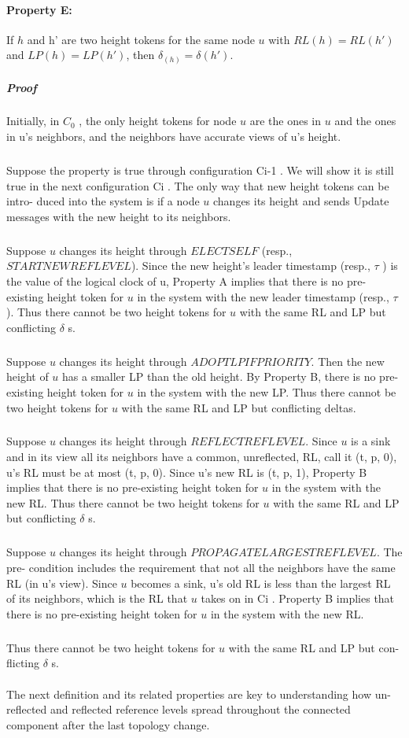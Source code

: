 \paragraph{Property E:}If $h$ and h' are two height tokens for the same node $u$ with $RL(h) = RL(h')$ and $LP(h) = LP(h')$, then $\delta _(h) = \delta (h' )$.
\subparagraph{Proof}Initially, in $C_0$ , the only height tokens for node $u$ are the ones in $u$ and the ones in u's neighbors, and the neighbors have accurate views of u's height.
\subparagraph{}Suppose the property is true through configuration Ci-1 . We will show it is still true in the next configuration Ci . The only way that new height tokens can be intro- duced into the system is if a node $u$ changes its height and sends Update messages with the new height to its neighbors.
\subparagraph{}Suppose $u$ changes its height through $ELECTSELF$ (resp., $STARTNEWREFLEVEL$). Since the new height's leader timestamp (resp., $\tau$ ) is the value of the logical clock of u, Property A implies that there is no pre-existing height token for $u$ in the system with the new leader timestamp (resp., $\tau$ ). Thus there cannot be two height tokens for $u$ with the same RL and LP but conflicting $\delta$ s.
\subparagraph{}Suppose $u$ changes its height through $ADOPTLPIFPRIORITY$. Then the new height of $u$ has a smaller LP than the old height. By Property B, there is no pre-existing height token for $u$ in the system with the new LP. Thus there cannot be two height tokens for $u$ with the same RL and LP but conflicting deltas.
\subparagraph{}Suppose $u$ changes its height through $REFLECTREFLEVEL$. Since $u$ is a sink and in its view all its neighbors have a common, unreflected, RL, call it (t, p, 0), u's RL must be at most (t, p, 0). Since u's new RL is (t, p, 1), Property B implies that there is no pre-existing height token for $u$ in the system with the new RL. Thus there cannot be two height tokens for $u$ with the same RL and LP but conflicting $\delta$ s. 
\subparagraph{}Suppose $u$ changes its height through $PROPAGATELARGESTREFLEVEL$. The pre- condition includes the requirement that not all the neighbors have the same RL (in u's view). Since $u$ becomes a sink, u's old RL is less than the largest RL of its neighbors, which is the RL that $u$ takes on in Ci . Property B implies that there is no pre-existing height token for $u$ in the system with the new RL. 
\subparagraph{}Thus there cannot be two height tokens for $u$ with the same RL and LP but con- flicting $\delta$ s.

\paragraph{}The next definition and its related properties are key to understanding how un- reflected and reflected reference levels spread throughout the connected component after the last topology change.
